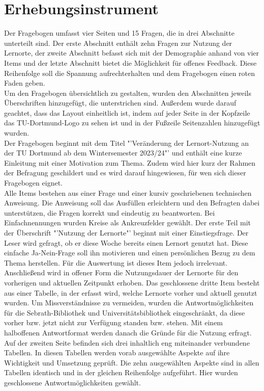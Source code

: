 \documentclass[11pt, a4paper]{article}
\begin{document}
\section{Erhebungsinstrument}
\label{Erhebungsinstrument}
Der Fragebogen umfasst vier Seiten und 15 Fragen, die in drei Abschnitte unterteilt sind. Der erste Abschnitt enthält zehn Fragen zur Nutzung der Lernorte, der zweite Abschnitt befasst sich mit der Demographie anhand von vier Items und der letzte Abschnitt bietet die Möglichkeit für offenes Feedback. Diese Reihenfolge soll die Spannung aufrechterhalten und dem Fragebogen einen roten Faden geben. \\
Um den Fragebogen übersichtlich zu gestalten, wurden den Abschnitten jeweils Überschriften hinzugefügt, die unterstrichen sind. Außerdem wurde darauf geachtet, dass das Layout einheitlich ist, indem auf jeder Seite in der Kopfzeile das TU-Dortmund-Logo zu sehen ist und in der Fußzeile Seitenzahlen hinzugefügt wurden. \\
Der Fragebogen beginnt mit dem Titel "'Veränderung der Lernort-Nutzung an der TU Dortmund ab dem Wintersemester 2023/24"' und enthält eine kurze Einleitung mit einer Motivation zum Thema. Zudem wird hier kurz der Rahmen der Befragung geschildert und es wird darauf hingewiesen, für wen sich dieser Fragebogen eignet.\\
Alle Items bestehen aus einer Frage und einer kursiv geschriebenen technischen Anweisung. Die Anweisung soll das Ausfüllen erleichtern und den Befragten dabei unterstützen, die Fragen korrekt und eindeutig zu beantworten. Bei Einfachnennungen wurden Kreise als Ankreuzfelder gewählt.
Der erste Teil mit der Überschrift "'Nutzung der Lernorte"' beginnt mit einer Einstiegsfrage.
Der Leser wird gefragt, ob er diese Woche bereits einen Lernort genutzt hat. Diese einfache Ja-Nein-Frage soll ihn motivieren und einen persönlichen Bezug zu dem Thema herstellen. Für die Auswertung ist dieses Item jedoch irrelevant.\\
Anschließend wird in offener Form die Nutzungsdauer der Lernorte für den vorherigen und aktuellen Zeitpunkt erhoben. Das geschlossene dritte Item besteht aus einer Tabelle, in der erfasst wird, welche Lernorte vorher und aktuell genutzt wurden.
Um Missverständnisse zu vermeiden, wurden die Antwortmöglichkeiten für die Sebrath-Bibliothek und Universitätsbibliothek eingeschränkt, da diese vorher bzw. jetzt nicht zur Verfügung standen bzw. stehen.
Mit einem halboffenen Antwortformat werden danach die Gründe für die Nutzung erfragt.
Auf der zweiten Seite befinden sich drei inhaltlich eng miteinander verbundene Tabellen. In diesen Tabellen werden vorab ausgewählte Aspekte auf ihre Wichtigkeit und Umsetzung geprüft. Die zehn ausgewählten Aspekte sind in allen Tabellen identisch und  in der gleichen Reihenfolge aufgeführt. Hier wurden geschlossene Antwortmöglichkeiten gewählt.
\end{document}
